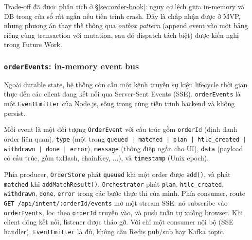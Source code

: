 Trade-off đã được phân tích ở \S\ref{sec:order-book}: nguy cơ lệch giữa in-memory và DB trong cửa sổ rất ngắn nếu tiến trình crash. Đây là chấp nhận được ở MVP, nhưng phương án thay thế thông qua \emph{outbox pattern} (append event vào một bảng riêng cùng transaction với mutation, sau đó dispatch tách biệt) được kiến nghị trong Future Work.

\subsubsection{\texttt{orderEvents}: in-memory event bus}

Ngoài durable state, hệ thống còn cần một kênh truyền sự kiện lifecycle thời gian thực đến các client đang kết nối qua Server-Sent Events (SSE). \texttt{orderEvents} là một \texttt{EventEmitter} của Node.js, sống trong cùng tiến trình backend và không persist.

Mỗi event là một đối tượng \texttt{OrderEvent} với cấu trúc gồm \texttt{orderId} (định danh order liên quan), \texttt{type} (một trong \texttt{queued | matched | plan | htlc\_created | withdrawn | done | error}), \texttt{message} (thông điệp ngắn cho UI), \texttt{data} (payload có cấu trúc, gồm txHash, chainKey, ...), và \texttt{timestamp} (Unix epoch).

Phía producer, \texttt{OrderStore} phát \texttt{queued} khi một order được \texttt{add()}, và phát \texttt{matched} khi \texttt{addMatchResult()}. \texttt{Orchestrator} phát \texttt{plan}, \texttt{htlc\_created}, \texttt{withdrawn}, \texttt{done}, \texttt{error} trong các bước thực thi của mình. Phía consumer, route \texttt{GET /api/intent/:orderId/events} mở một stream SSE: nó subscribe vào \texttt{orderEvents}, lọc theo \texttt{orderId} truyền vào, và push tuần tự xuống browser. Khi client đóng kết nối, listener được tháo gỡ. Với chỉ một consumer nội bộ (SSE handler), \texttt{EventEmitter} là đủ, không cần Redis pub/sub hay Kafka topic.

